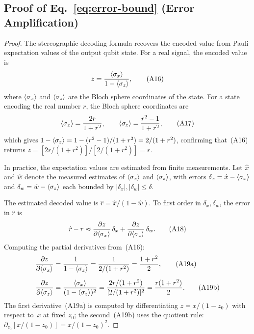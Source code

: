 \subsection*{Proof of Eq.~\eqref{eq:error-bound} (Error Amplification)}

\begin{proof}
	The stereographic decoding formula recovers the encoded
	value from Pauli expectation values of the output qubit
	state.  For a real signal, the encoded value is
	\begin{equation}
		z = \frac{\langle\sigma_x\rangle}{1 - \langle\sigma_z\rangle},
		\tag{A16}
	\end{equation}
	where $\langle\sigma_x\rangle$ and
	$\langle\sigma_z\rangle$ are the Bloch sphere
	coordinates of the state.  For a state encoding the
	real number $r$, the Bloch sphere coordinates are
	\begin{equation}
		\langle\sigma_x\rangle = \frac{2r}{1+r^2},
		\qquad
		\langle\sigma_z\rangle = \frac{r^2 - 1}{1+r^2},
		\tag{A17}
	\end{equation}
	which gives
	$1 - \langle\sigma_z\rangle = 1 - (r^2-1)/(1+r^2)
		= 2/(1+r^2)$, confirming that~(A16) returns
	$z = [2r/(1+r^2)]/[2/(1+r^2)] = r$.

	In practice, the expectation values are estimated from
	finite measurements.  Let $\hat{x}$ and $\hat{w}$
	denote the measured estimates of
	$\langle\sigma_x\rangle$ and $\langle\sigma_z\rangle$,
	with errors $\delta_x = \hat{x} - \langle\sigma_x\rangle$
	and $\delta_w = \hat{w} - \langle\sigma_z\rangle$ each
	bounded by $|\delta_x|, |\delta_w| \leq \delta$.

	The estimated decoded value is
	$\hat{r} = \hat{x}/(1 - \hat{w})$.  To first order in
	$\delta_x, \delta_w$, the error in $\hat{r}$ is
	\begin{equation}
		\hat{r} - r \approx
		\frac{\partial z}{\partial\langle\sigma_x\rangle}\,\delta_x
		+ \frac{\partial z}{\partial\langle\sigma_z\rangle}\,\delta_w.
		\tag{A18}
	\end{equation}
	Computing the partial derivatives from~(A16):
	\begin{align}
		\frac{\partial z}{\partial\langle\sigma_x\rangle}
		 & = \frac{1}{1-\langle\sigma_z\rangle}
		= \frac{1}{2/(1+r^2)}
		= \frac{1+r^2}{2},
		\tag{A19a}                                                     \\[6pt]
		\frac{\partial z}{\partial\langle\sigma_z\rangle}
		 & = \frac{\langle\sigma_x\rangle}{(1-\langle\sigma_z\rangle)^2}
		= \frac{2r/(1+r^2)}{[2/(1+r^2)]^2}
		= \frac{r(1+r^2)}{2}.
		\tag{A19b}
	\end{align}
	The first derivative~(A19a) is computed by
	differentiating $z = x/(1-z_0)$ with respect to~$x$
	at fixed $z_0$; the second~(A19b) uses the quotient
	rule:
	$\partial_{z_0}[x/(1-z_0)] = x/(1-z_0)^2$.


\end{proof}
